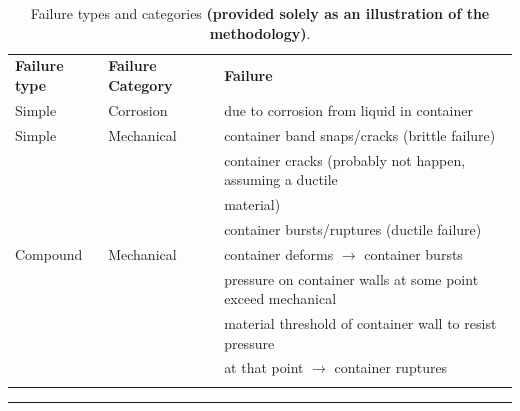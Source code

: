 \begin{table}
\begin{center}
    \begin{tabular}{lll}\Xhline{2\arrayrulewidth}
    \textbf{Failure type}     & \textbf{Failure Category}   & \textbf{Failure}  \\
    \Xhline{2\arrayrulewidth}
    Simple    & Corrosion          & due to corrosion from liquid in container                                                                                                                                                                                                        \\ \hline
    Simple    & Mechanical  & container band snaps/cracks (brittle failure)                                                                                                         \\
    ~                & ~                  & container cracks (probably not happen, assuming a ductile  \\
    ~                & ~                  & \qquad material) \\
    ~                & ~                  & container bursts/ruptures (ductile failure)                                                                                                           \\ \hline
    Compound  & Mechanical  & container deforms $\to$ container bursts                                                                                                                  \\
    ~                & ~                  & pressure on container walls at some point exceed mechanical    \\
    ~                & ~                  & \qquad material  threshold of container wall to resist pressure  \\ 
                     &                    & \qquad  at that point $\to$ container ruptures \\ \Xhline{2\arrayrulewidth}
    \end{tabular}
    \small\caption{Failure types and categories \textbf{(provided solely as an illustration of the methodology)}.}\normalsize\hrule
\label{table:failure_causes}
\end{center}
\end{table}

